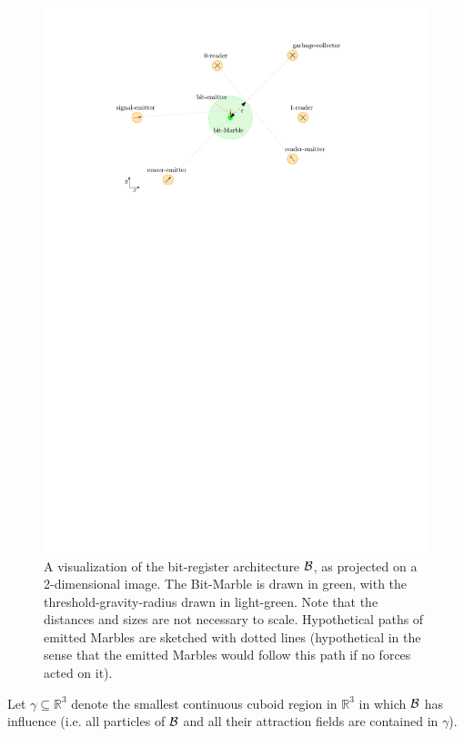 \begin{figure}
    \centering
    \includegraphics{figures/bit_base.pdf}
    \caption{A visualization of the bit-register architecture $\mathcal{B}$, as projected on a 2-dimensional image. 
    	The Bit-Marble is drawn in green, with the threshold-gravity-radius drawn in light-green. 
    	Note that the distances and sizes are not necessary to scale. Hypothetical paths of emitted Marbles are sketched with dotted lines (hypothetical in the sense that the emitted Marbles would follow this path if no forces acted on it).}
    \label{fig:bit_architecture}
\end{figure}

Let $\gamma \subseteq \mathbb{R}^3$ denote the smallest continuous cuboid region in $\mathbb{R}^3$ in which $\mathcal{B}$ has influence (i.e. all particles of $\mathcal{B}$ and all their attraction fields are contained in $\gamma$). 

